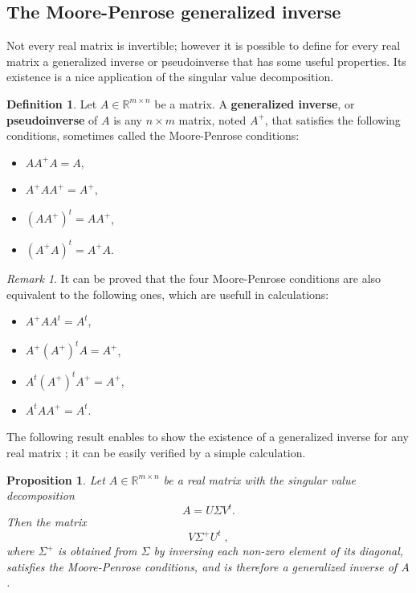 \documentclass{report}
\newtheorem{prop}{Proposition}
\theoremstyle{definition}
\newtheorem{defin}{Definition}
\theoremstyle{remark}
\newtheorem{remark}{Remark}
\begin{document}
\subsection{The Moore-Penrose generalized inverse}

Not every real matrix is invertible; however it is possible to define for every real matrix a generalized inverse or pseudoinverse that has some useful properties. Its existence is a nice application of the singular value decomposition.

\begin{defin}
        Let $A \in \mathbb{R}^{m\times n}$ be a matrix. A \textbf{generalized inverse}, or \textbf{pseudoinverse} of $A$ is any $n \times m$ matrix, noted $A^+$, that satisfies the following conditions, sometimes called the Moore-Penrose conditions:
        \begin{itemize}
        \item $ A A^+ A = A $,
        \item $ A^+ A A^+ = A^+ $,
        \item $ (A A^+)^t = A A^+ $,
        \item $ (A^+ A)^t = A^+ A $.
        \end{itemize}
\end{defin}


\begin{remark}
    It can be proved that the four Moore-Penrose conditions are also equivalent to the following ones, which are usefull in calculations:
\begin{itemize}
        \item
                  $A^+ A A^t = A^t$,
                \item $      A^+ (A^+)^t A = A^+ $,
               \item $       A^t (A^+)^t A^+ = A^+$,
               \item $     A^t A A^+ = A^t.$
        \end{itemize}
\end{remark}


\medskip
The following result enables to show the existence of a generalized inverse for any real matrix ; it can be easily verified by a simple calculation.

        \begin{prop}
                Let $A \in \mathbb{R}^{m \times n}$ be a real matrix with the singular value decomposition $$A = U \Sigma V^t.$$ Then the matrix $$V \Sigma^+ U^t\;,$$
                where $\Sigma ^+$ is obtained from $\Sigma$ by inversing each non-zero element of its diagonal, satisfies the Moore-Penrose conditions, and is therefore a generalized inverse of $A$. 
        \end{prop}
\end{document}
